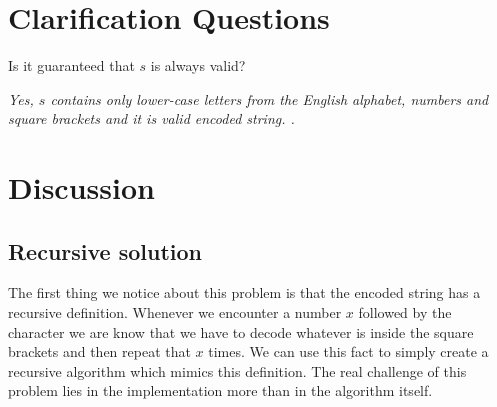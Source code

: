 \section{Clarification Questions}

\begin{QandA}
	\item Is it guaranteed that $s$ is always valid?
	\begin{answered}
		\textit{Yes, $s$ contains only lower-case letters from the English alphabet, numbers and square brackets and it is valid encoded string. .}
	\end{answered}

\end{QandA}

\section{Discussion}
\label{decode_string:sec:discussion}


\subsection{Recursive solution}
\label{decode_string:sec:recursive}
The first thing we notice about this problem is that the encoded string has a recursive definition.
Whenever we encounter a number $x$ followed by the \inline{'['} character we are know that we have
to decode whatever is inside the square brackets and then repeat that $x$ times. We can use this
fact to simply create a recursive algorithm which mimics this definition. The real challenge of this
problem lies in the implementation more than in the algorithm itself.

